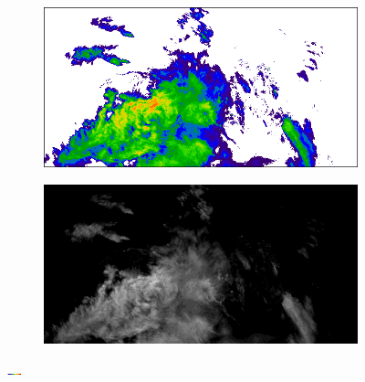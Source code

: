 \documentclass{beamer}
\begin{document}
\begin{frame}{}
	\begin{figure}
	    \begin{subfigure}{.48\linewidth}
	        \centering
	        \includegraphics[width=\linewidth]{fig/04_czrad_colour.png}
	    \end{subfigure}
	    \begin{subfigure}{.48\linewidth}
	        \centering
	        \includegraphics[width=\linewidth]{fig/04_czrad_gray.png}
	    \end{subfigure}
	\end{figure}

	\begin{figure}
	    \centering
	    \begin{minipage}{.8\linewidth}
	        \begin{mdframed}[style=MyFrame,nobreak=true,align=center,userdefinedwidth=.8\linewidth]
	            \includegraphics[width=\linewidth]{fig/04_colourspace.png}
	        \end{mdframed}
	    \end{minipage}
	\end{figure}


\end{frame}
\end{document}
